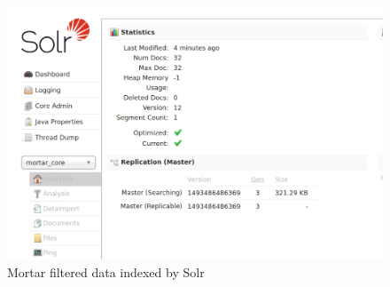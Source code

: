 \begin{enumerate}
\begin{enumerate}[label={}]
    \begin{figure}
      \centering
      \includegraphics[scale=0.35]{screenshots/mortar-core.png}
      \caption{Mortar filtered data indexed by Solr}
      \label{mortar-core}
    \end{figure}
  \end{enumerate}
\end{enumerate}

